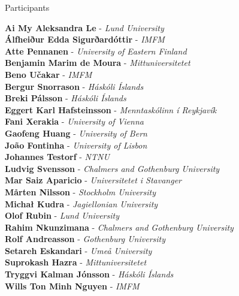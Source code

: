 \documentclass[12pt, openany, twoside]{report}      %
\begin{document}
\noindent
{\LARGE Participants}

\bigskip
\bigskip
\noindent
\textbf{Ai My Aleksandra Le} -
\textit{Lund University}
\\
\textbf{Álfheiður Edda Sigurðardóttir} -
\textit{IMFM}
\\
\textbf{Atte Pennanen} -
\textit{University of Eastern Finland}
\\
\textbf{Benjamin Marim de Moura} -
\textit{Mittuniversitetet}
\\
\textbf{Beno Učakar} -
\textit{IMFM}
\\
\textbf{Bergur Snorrason} -
\textit{Háskóli Íslands}
\\
\textbf{Breki Pálsson} -
\textit{Háskóli Íslands}
\\
\textbf{Eggert Karl Hafsteinsson} -
\textit{Menntaskólinn í Reykjavík}
\\
\textbf{Fani Xerakia} -
\textit{University of Vienna}
\\
\textbf{Gaofeng Huang} -
\textit{University of Bern}
\\
\textbf{João Fontinha} -
\textit{University of Lisbon}
\\
\textbf{Johannes Testorf} -
\textit{NTNU}
\\
\textbf{Ludvig Svensson} -
\textit{Chalmers and Gothenburg University}
\\
\textbf{Mar Saiz Aparicio} -
\textit{Universitetet i Stavanger}
\\
\textbf{Mårten Nilsson} -
\textit{Stockholm University}
\\
\textbf{Michał Kudra} -
\textit{Jagiellonian University}
\\
\textbf{Olof Rubin} -
\textit{Lund University}
\\
\textbf{Rahim Nkunzimana} -
\textit{Chalmers and Gothenburg University}
\\
\textbf{Rolf Andreasson} -
\textit{Gothenburg University}
\\
\textbf{Setareh Eskandari} -
\textit{Umeå University}
\\
\textbf{Suprokash Hazra} -
\textit{Mittuniversitetet}
\\
\textbf{Tryggvi Kalman Jónsson} -
\textit{Háskóli Íslands}
\\
\textbf{Wills Ton Minh Nguyen} -
\textit{IMFM}
\restoregeometry

\newpage
\end{document}

